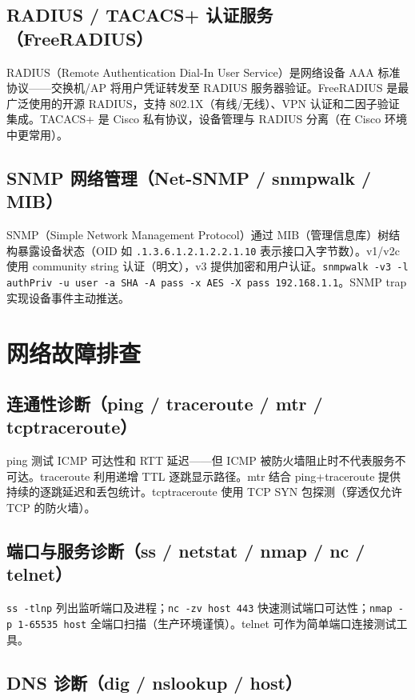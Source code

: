 \documentclass[12pt,UTF8]{ctexbook}
\begin{document}
  \section{RADIUS / TACACS+ 认证服务（FreeRADIUS）}

RADIUS（Remote Authentication Dial-In User Service）是网络设备 AAA 标准协议——交换机/AP 将用户凭证转发至 RADIUS 服务器验证。FreeRADIUS 是最广泛使用的开源 RADIUS，支持 802.1X（有线/无线）、VPN 认证和二因子验证集成。TACACS+ 是 Cisco 私有协议，设备管理与 RADIUS 分离（在 Cisco 环境中更常用）。

  \section{SNMP 网络管理（Net-SNMP / snmpwalk / MIB）}

SNMP（Simple Network Management Protocol）通过 MIB（管理信息库）树结构暴露设备状态（OID 如 \verb|.1.3.6.1.2.1.2.2.1.10| 表示接口入字节数）。v1/v2c 使用 community string 认证（明文），v3 提供加密和用户认证。\verb|snmpwalk -v3 -l authPriv -u user -a SHA -A pass -x AES -X pass 192.168.1.1|。SNMP trap 实现设备事件主动推送。

\chapter{网络故障排查}
\label{chap:network-troubleshooting}

  \section{连通性诊断（ping / traceroute / mtr / tcptraceroute）}

ping 测试 ICMP 可达性和 RTT 延迟——但 ICMP 被防火墙阻止时不代表服务不可达。traceroute 利用递增 TTL 逐跳显示路径。mtr 结合 ping+traceroute 提供持续的逐跳延迟和丢包统计。tcptraceroute 使用 TCP SYN 包探测（穿透仅允许 TCP 的防火墙）。

  \section{端口与服务诊断（ss / netstat / nmap / nc / telnet）}

\verb|ss -tlnp| 列出监听端口及进程；\verb|nc -zv host 443| 快速测试端口可达性；\verb|nmap -p 1-65535 host| 全端口扫描（生产环境谨慎）。telnet 可作为简单端口连接测试工具。

  \section{DNS 诊断（dig / nslookup / host）}
\end{document}
